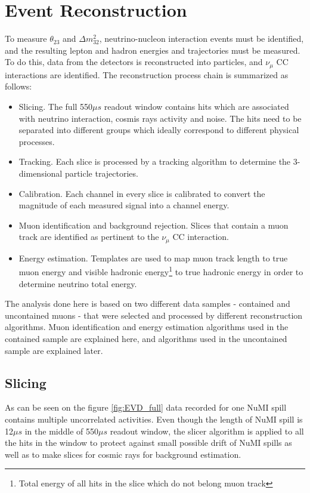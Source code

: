 \chapter{Event Reconstruction}
\label{reconstruction_chapter}

To measure $\theta_{23}$ and $\Delta m_{32}^2$, neutrino-nucleon interaction events must be identified, and the
resulting lepton and hadron energies and trajectories must be measured. To do this, data from the
detectors is reconstructed into particles, and $\nu_\mu$ CC interactions are identified. The
reconstruction process chain is summarized as follows:
\begin{itemize}
\item Slicing. The full 550$\mu s$ readout window contains hits which are associated with
neutrino interaction, cosmis rays activity and noise. The hits need to be separated into
different groups which ideally correspond to different physical processes.
\item Tracking.  Each slice is processed by a tracking algorithm to determine the 3-dimensional particle
trajectories.
\item Calibration. Each channel in every slice is calibrated to convert the magnitude of each
measured signal into a channel energy.
\item Muon identification and background rejection. Slices that contain a muon track are identified
as pertinent to the $\nu_\mu$ CC interaction.
\item Energy estimation. Templates are used to map muon track length to true muon energy and visible 
hadronic energy\footnote{Total energy of all hits in the slice which do not belong muon track} to true 
hadronic energy in order to determine neutrino total energy.  
\end{itemize}
The analysis done here is based on two different data samples - contained and uncontained muons -
that were selected and processed by different reconstruction algorithms. Muon identification and energy
estimation algorithms used in the contained sample are explained here, and algorithms used in the uncontained
sample are explained later.

\section{Slicing}
As can be seen on the figure \ref{fig:EVD_full} data recorded for one NuMI spill contains
multiple uncorrelated activities. Even though the length of NuMI spill is 12$\mu s$ in the middle
of 550$\mu s$ readout window, the slicer algorithm is applied to all the hits in the window to protect 
against small possible drift of NuMI spills as well as to make slices for cosmic rays for background
estimation.


